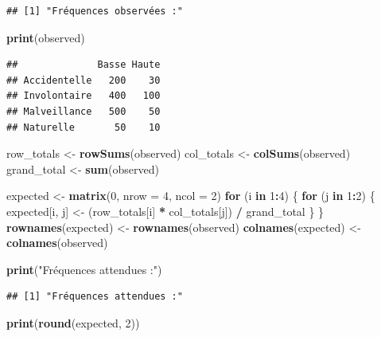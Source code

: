 \documentclass[
]{article}
\newenvironment{Shaded}{\begin{snugshade}}{\end{snugshade}}
\newcommand{\AttributeTok}[1]{\textcolor[rgb]{0.13,0.29,0.53}{#1}}
\newcommand{\ControlFlowTok}[1]{\textcolor[rgb]{0.13,0.29,0.53}{\textbf{#1}}}
\newcommand{\DecValTok}[1]{\textcolor[rgb]{0.00,0.00,0.81}{#1}}
\newcommand{\FunctionTok}[1]{\textcolor[rgb]{0.13,0.29,0.53}{\textbf{#1}}}
\newcommand{\NormalTok}[1]{#1}
\newcommand{\OtherTok}[1]{\textcolor[rgb]{0.56,0.35,0.01}{#1}}
\newcommand{\SpecialCharTok}[1]{\textcolor[rgb]{0.81,0.36,0.00}{\textbf{#1}}}
\newcommand{\StringTok}[1]{\textcolor[rgb]{0.31,0.60,0.02}{#1}}
\begin{document}
\begin{verbatim}
## [1] "Fréquences observées :"
\end{verbatim}

\begin{Shaded}
\begin{Highlighting}[]
\FunctionTok{print}\NormalTok{(observed)}
\end{Highlighting}
\end{Shaded}

\begin{verbatim}
##              Basse Haute
## Accidentelle   200    30
## Involontaire   400   100
## Malveillance   500    50
## Naturelle       50    10
\end{verbatim}

\begin{Shaded}
\begin{Highlighting}[]
\NormalTok{row\_totals }\OtherTok{\textless{}{-}} \FunctionTok{rowSums}\NormalTok{(observed)}
\NormalTok{col\_totals }\OtherTok{\textless{}{-}} \FunctionTok{colSums}\NormalTok{(observed)}
\NormalTok{grand\_total }\OtherTok{\textless{}{-}} \FunctionTok{sum}\NormalTok{(observed)}

\NormalTok{expected }\OtherTok{\textless{}{-}} \FunctionTok{matrix}\NormalTok{(}\DecValTok{0}\NormalTok{, }\AttributeTok{nrow =} \DecValTok{4}\NormalTok{, }\AttributeTok{ncol =} \DecValTok{2}\NormalTok{)}
\ControlFlowTok{for}\NormalTok{ (i }\ControlFlowTok{in} \DecValTok{1}\SpecialCharTok{:}\DecValTok{4}\NormalTok{) \{}
  \ControlFlowTok{for}\NormalTok{ (j }\ControlFlowTok{in} \DecValTok{1}\SpecialCharTok{:}\DecValTok{2}\NormalTok{) \{}
\NormalTok{    expected[i, j] }\OtherTok{\textless{}{-}}\NormalTok{ (row\_totals[i] }\SpecialCharTok{*}\NormalTok{ col\_totals[j]) }\SpecialCharTok{/}\NormalTok{ grand\_total}
\NormalTok{  \}}
\NormalTok{\}}
\FunctionTok{rownames}\NormalTok{(expected) }\OtherTok{\textless{}{-}} \FunctionTok{rownames}\NormalTok{(observed)}
\FunctionTok{colnames}\NormalTok{(expected) }\OtherTok{\textless{}{-}} \FunctionTok{colnames}\NormalTok{(observed)}

\FunctionTok{print}\NormalTok{(}\StringTok{"Fréquences attendues :"}\NormalTok{)}
\end{Highlighting}
\end{Shaded}

\begin{verbatim}
## [1] "Fréquences attendues :"
\end{verbatim}

\begin{Shaded}
\begin{Highlighting}[]
\FunctionTok{print}\NormalTok{(}\FunctionTok{round}\NormalTok{(expected, }\DecValTok{2}\NormalTok{))}
\end{Highlighting}
\end{Shaded}
\end{document}
